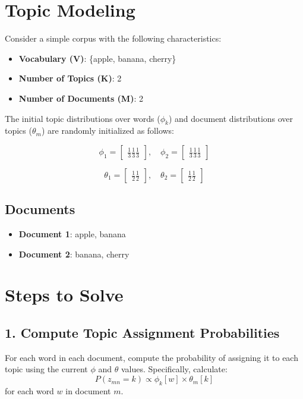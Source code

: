 \documentclass{article}
\begin{document}
\newpage
\section { Topic Modeling }
Consider a simple corpus with the following characteristics:

\begin{itemize}
    \item \textbf{Vocabulary (V)}: \{apple, banana, cherry\}
    \item \textbf{Number of Topics (K)}: 2
    \item \textbf{Number of Documents (M)}: 2
\end{itemize}

The initial topic distributions over words ($\phi_k$) and document distributions over topics ($\theta_m$) are randomly initialized as follows:

\[
\phi_1 =
\begin{bmatrix}
\frac{1}{3} \frac{1}{3} \frac{1}{3}
\end{bmatrix}, \quad
\phi_2 =
\begin{bmatrix}
\frac{1}{3} \frac{1}{3} \frac{1}{3}
\end{bmatrix}
\]

\[
\theta_1 =
\begin{bmatrix}
\frac{1}{2}  \frac{1}{2}
\end{bmatrix}, \quad
\theta_2 =
\begin{bmatrix}
\frac{1}{2} \frac{1}{2}
\end{bmatrix}
\]

\subsection*{Documents}
\begin{itemize}
    \item \textbf{Document 1}: apple, banana
    \item \textbf{Document 2}: banana, cherry
\end{itemize}

\section*{Steps to Solve}

\subsection*{1. Compute Topic Assignment Probabilities}
For each word in each document, compute the probability of assigning it to each topic using the current $\phi$ and $\theta$ values. Specifically, calculate:
\[
P(z_{mn} = k) \propto \phi_k[w] \times \theta_m[k]
\]
for each word $w$ in document $m$.
\end{document}
